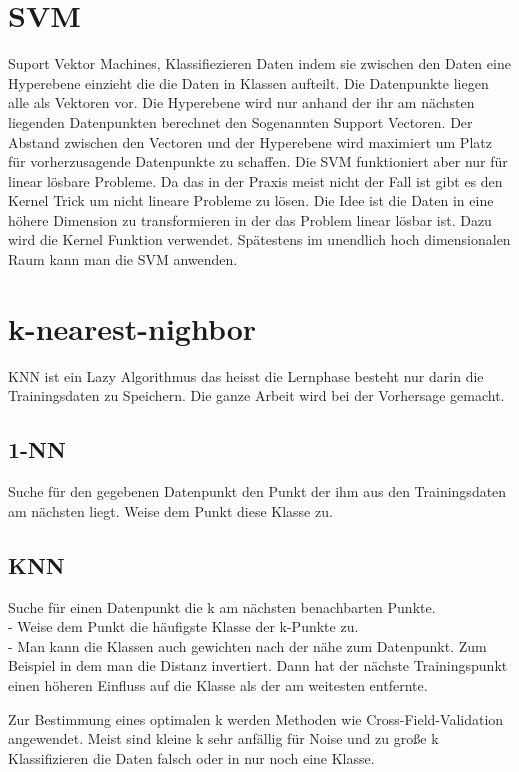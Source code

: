 \documentclass[a4paper]{scrartcl}
\begin{document}
\section{SVM}
Suport Vektor Machines, Klassifiezieren Daten indem sie zwischen den Daten eine Hyperebene einzieht die die Daten in Klassen aufteilt. Die Datenpunkte liegen alle als Vektoren vor. Die Hyperebene wird nur anhand der ihr am nächsten liegenden Datenpunkten berechnet den Sogenannten Support Vectoren. Der Abstand zwischen den Vectoren und der Hyperebene wird maximiert um Platz für vorherzusagende Datenpunkte zu schaffen. Die SVM funktioniert aber nur für linear lösbare Probleme. Da das in der Praxis meist nicht der Fall ist gibt es den Kernel Trick um nicht lineare Probleme zu lösen. Die Idee ist die Daten in eine höhere Dimension zu transformieren in der das Problem linear lösbar ist. Dazu wird die Kernel Funktion verwendet. Spätestens im unendlich hoch dimensionalen Raum kann man die SVM anwenden.
\section{k-nearest-nighbor}
KNN ist ein Lazy Algorithmus das heisst die Lernphase besteht nur darin die Trainingsdaten zu Speichern. Die ganze Arbeit wird bei der Vorhersage gemacht.
\subsection{1-NN} 
Suche für den gegebenen Datenpunkt den Punkt der ihm aus den Trainingsdaten am nächsten liegt. Weise dem Punkt diese Klasse zu. 
\subsection{KNN}
Suche für einen Datenpunkt die k am nächsten benachbarten Punkte.\\
- Weise dem Punkt die häufigste Klasse der k-Punkte zu.\\
- Man kann die Klassen auch gewichten nach der nähe zum Datenpunkt. Zum Beispiel in dem man die Distanz invertiert. Dann hat der nächste Trainingspunkt einen höheren Einfluss auf die Klasse als der am weitesten entfernte. 

Zur Bestimmung eines optimalen k werden Methoden wie Cross-Field-Validation angewendet. Meist sind kleine k sehr anfällig für Noise und zu große k Klassifizieren die Daten falsch oder in nur noch eine Klasse.
\end{document}
